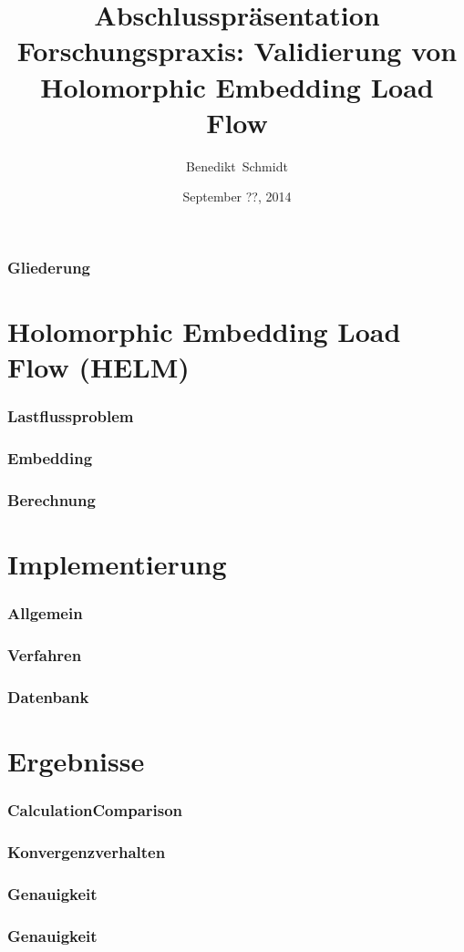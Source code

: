 \documentclass[hyperref={pdfpagelabels=false},compress]{beamer}
\title{Abschlusspräsentation Forschungspraxis: Validierung von Holomorphic Embedding Load Flow}
\author[Schmidt]{Benedikt~Schmidt}
\institute{Technische Universität München, Germany}
\date{September ??, 2014}
\begin{document}
\begin{frame}
	\titlepage
\end{frame}

\begin{frame}
	\frametitle{Gliederung}
	\tableofcontents
\end{frame}

\section{Holomorphic Embedding Load Flow (HELM)}
\begin{frame}
	\frametitle{Lastflussproblem}
\end{frame}

\begin{frame}
	\frametitle{Embedding}
\end{frame}

\begin{frame}
	\frametitle{Berechnung}
\end{frame}

\section{Implementierung}

\begin{frame}
	\frametitle{Allgemein}
\end{frame}

\begin{frame}
	\frametitle{Verfahren}
\end{frame}

\begin{frame}
	\frametitle{Datenbank}
\end{frame}

\section{Ergebnisse}

\begin{frame}
	\frametitle{CalculationComparison}
\end{frame}

\begin{frame}
	\frametitle{Konvergenzverhalten}
\end{frame}

\begin{frame}
	\frametitle{Genauigkeit}
\end{frame}

\begin{frame}
	\frametitle{Genauigkeit}
\end{frame}
\end{document}
